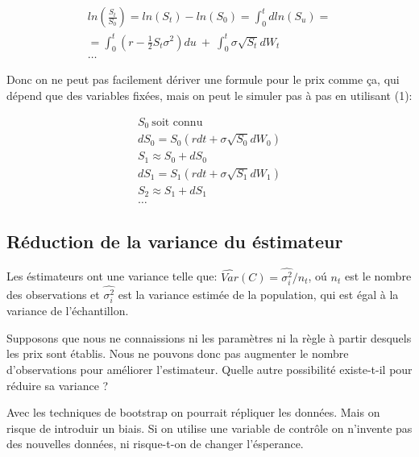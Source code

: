 \documentclass[a4paper,12pt]{scrartcl}
\begin{document}
\begin{equation} \label{5}
\begin{multlined}
ln( \frac{S_t}{S_0} ) = ln(S_t)-ln(S_0) = \int_0^t dln(S_u) = \\
= \int_0^t (r-\frac{1}{2} S_t \sigma^2)du~+~\int_0^t \sigma \sqrt{S_t}dW_t \\
\dots
\end{multlined}
\end{equation}

Donc on ne peut pas facilement dériver une formule pour le prix comme ça, qui dépend que des variables fixées, mais on peut le simuler pas à pas en utilisant (1):

\begin{equation} \label{6}
\begin{multlined}
S_0 ~\text{soit connu} \\
dS_0 = S_0(rdt + \sigma \sqrt{S_0} dW_0) \\
S_1 \approx S_0 + dS_0 \\
dS_1 = S_1(rdt + \sigma \sqrt{S_1} dW_1) \\
S_2 \approx S_1 + dS_1 \\
\dots
\end{multlined}
\end{equation}



\subsection{Réduction de la variance du éstimateur}

Les éstimateurs ont une variance telle que:
$ \hat{Var}(C) = \hat{\sigma_i^2} / n_t$, oú $n_t$ est le nombre des observations et $\hat{\sigma_i^2}$ est la variance estimée de la population, qui est égal à la variance de l'échantillon.

Supposons que nous ne connaissions ni les paramètres ni la règle à partir desquels les prix sont établis. 
Nous ne pouvons donc pas augmenter le nombre d'observations pour améliorer l'estimateur.
Quelle autre possibilité existe-t-il pour réduire sa variance ?

Avec les techniques de bootstrap on pourrait répliquer les données. 
Mais on risque de introduir un biais.
Si on utilise une variable de contrôle on n'invente pas des nouvelles données, ni risque-t-on de changer l'ésperance.


\clearpage

\appendix
\appendixpage
\addappheadtotoc
\end{document}
